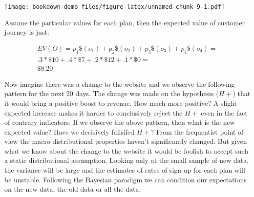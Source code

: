 \documentclass[
]{book}
\theoremstyle{definition}
\theoremstyle{definition}
\theoremstyle{definition}
\theoremstyle{remark}
\begin{document}
\texttt{[image: bookdown-demo\_files/figure-latex/unnamed-chunk-9-1.pdf]}

Assume the particular values for each plan, then the expected value of customer journey is just:

\begin{equation}
\begin{split}
EV(O) =  p_{1}\$(o_{1}) + p_{2}\$(o_{2}) + p_{3}\$(o_{3}) + p_{4}\$(o_{4})  = \\ .3*\$10 + .4*\$7 + .2*\$12 + .1*\$0  = \\ \$8.20 
\end{split}
\end{equation}

Now imagine there was a change to the website and we observe the following pattern for the next 20 days. The change was made on the hypothesis (\(H+\)) that it would bring a positive boost to revenue. How much more positive? A slight expected increase makes it harder to conclusively reject the \(H+\) even in the fact of contrary indicators. If we observe the above pattern, then what is the new expected value? Have we decisively falisifed \(H+\)? From the frequentist point of view the macro distributional properties haven't significantly changed. But given what we know about the change to the website it would be foolish to accept such a static distributional assumption. Looking only at the small sample of new data, the variance will be large and the estimates of rates of sign-up for each plan will be unstable. Following the Bayesian paradigm we can condition our expectations on the new data, the old data or all the data.
\end{document}

